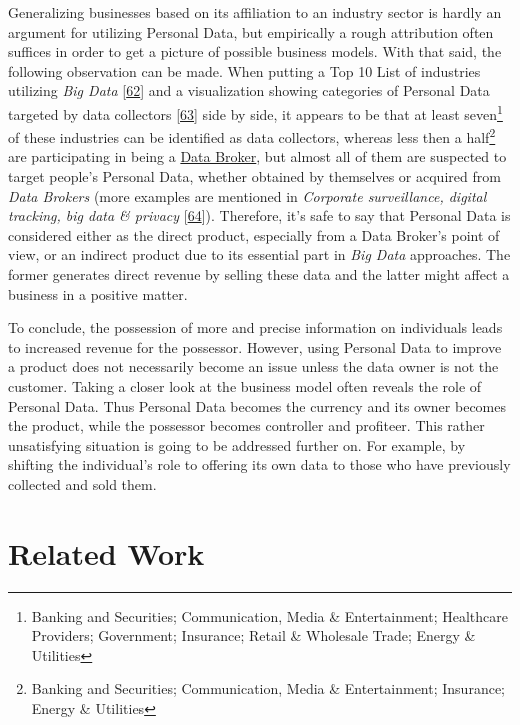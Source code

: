 \documentclass[12pt,english,a4paper,titlepage,cleardoublepage=empty,dottedtoc]{report}
\begin{document}
Generalizing businesses based on its affiliation to an industry sector
is hardly an argument for utilizing Personal Data, but empirically a
rough attribution often suffices in order to get a picture of possible
business models. With that said, the following observation can be made.
When putting a Top 10 List of industries utilizing \emph{Big Data}
{[}\protect\hyperlink{ref-graphic_2015_applications-of-big-data-in-10-industry-verticals}{62}{]}
and a visualization showing categories of Personal Data targeted by data
collectors
{[}\protect\hyperlink{ref-graphic_2012_personal-data-ecosystem}{63}{]}
side by side, it appears to be that at least seven\footnote{Banking and
  Securities; Communication, Media \& Entertainment; Healthcare
  Providers; Government; Insurance; Retail \& Wholesale Trade; Energy \&
  Utilities} of these industries can be identified as data collectors,
whereas less then a half\footnote{Banking and Securities; Communication,
  Media \& Entertainment; Insurance; Energy \& Utilities} are
participating in being a
\protect\hyperlink{terminologies--data-broker}{Data Broker}, but almost
all of them are suspected to target people's Personal Data, whether
obtained by themselves or acquired from \emph{Data Brokers} (more
examples are mentioned in \emph{Corporate surveillance, digital
tracking, big data \& privacy}
{[}\protect\hyperlink{ref-video_2016_corporate-surveillance-digital-tracking-big-data-privacy}{64}{]}).
Therefore, it's safe to say that Personal Data is considered either as
the direct product, especially from a Data Broker's point of view, or an
indirect product due to its essential part in \emph{Big Data}
approaches. The former generates direct revenue by selling these data
and the latter might affect a business in a positive matter.

To conclude, the possession of more and precise information on
individuals leads to increased revenue for the possessor. However, using
Personal Data to improve a product does not necessarily become an issue
unless the data owner is not the customer. Taking a closer look at the
business model often reveals the role of Personal Data. Thus Personal
Data becomes the currency and its owner becomes the product, while the
possessor becomes controller and profiteer. This rather unsatisfying
situation is going to be addressed further on. For example, by shifting
the individual's role to offering its own data to those who have
previously collected and sold them.

\hypertarget{related-work}{\section{Related Work}\label{related-work}}
\end{document}
